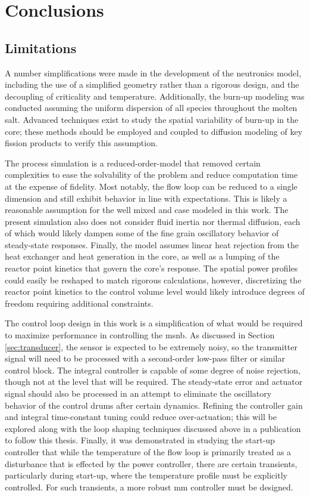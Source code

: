 \chapter{Conclusions}
\label{Chapter:Conclusions}

\section{Limitations}
A number simplifications were made in the development of the neutronics model, including the use of a simplified geometry rather than a rigorous design, and the decoupling of criticality and temperature. Additionally, the burn-up modeling was conducted assuming the uniform dispersion of all species throughout the molten salt. Advanced techniques exist to study the spatial variability of burn-up in the core; these methods should be employed and coupled to diffusion modeling of key fission products to verify this assumption. 

The process simulation is a reduced-order-model that removed certain complexities to ease the solvability of the problem and reduce computation time at the expense of fidelity. Most notably, the flow loop can be reduced to a single dimension and still exhibit behavior in line with expectations. This is likely a reasonable assumption for the well mixed and case modeled in this work. The present simulation also does not consider fluid inertia nor thermal diffusion, each of which would likely dampen some of the fine grain oscillatory behavior of steady-state responses. Finally, the model assumes linear heat rejection from the heat exchanger and heat generation in the core, as well as a lumping of the reactor point kinetics that govern the core's response. The spatial power profiles could easily be reshaped to match rigorous calculations, however, discretizing the reactor point kinetics to the control volume level would likely introduce degrees of freedom requiring additional constraints.

The control loop design in this work is a simplification of what would be required to maximize performance in controlling the \acs{msnb}. As discussed in Section \ref{sec:transducer}, the sensor is expected to be extremely noisy, so the transmitter signal will need to be processed with a second-order low-pass filter or similar control block. The integral controller is capable of some degree of noise rejection, though not at the level that will be required.  The steady-state error and actuator signal should also be processed in an attempt to eliminate the oscillatory behavior of the control drums after certain dynamics. Refining the controller gain and integral time-constant tuning could reduce over-actuation; this will be explored along with the loop shaping techniques discussed above in a publication to follow this thesis. Finally, it was demonstrated in studying the start-up controller that while the temperature of the flow loop is primarily treated as a disturbance that is effected by the power controller, there are certain transients, particularly during start-up, where the temperature profile must be explicitly controlled. For such transients, a more robust \acs{mm} controller must be designed.



